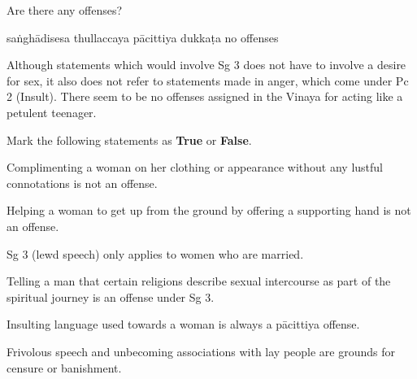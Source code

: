 \begin{exam}{\autoExamName}
\begin{problem}
  Are there any offenses?

  \begin{answers}{5}
    \bChoices
     saṅghādisesa\eAns
     thullaccaya\eAns
     pācittiya\eAns
     dukkaṭa\eAns
     no offenses\eAns
    \eChoices
  \end{answers}

  \begin{solution}
    Although statements which would involve Sg 3 does not have to involve a desire for sex,
    it also does not refer to statements made in anger, which come under Pc 2 (Insult).
    There seem to be no offenses assigned in the Vinaya for acting like a petulent teenager.
  \end{solution}

\end{problem}

\problemDivide

\begin{problem*}

  Mark the following statements as \textbf{True} or \textbf{False}.

  \bigskip

  \begin{parts}

    \item {} Complimenting a woman on her clothing or appearance without any
    lustful connotations is not an offense.

    \bigskip

    \item {} Helping a woman to get up from the ground by offering a
    supporting hand is not an offense.

    \bigskip

    \item {} Sg 3 (lewd speech) only applies to women who are married.

    \bigskip

    \item {} Telling a man that certain religions describe sexual
    intercourse as part of the spiritual journey is an offense under Sg 3.

    \bigskip

    \item {} Insulting language used towards a woman is always a pācittiya offense.

    \bigskip

    \item {} Frivolous speech and unbecoming associations with lay people
    are grounds for censure or banishment.

  \end{parts}

\end{problem*}

\end{exam}

